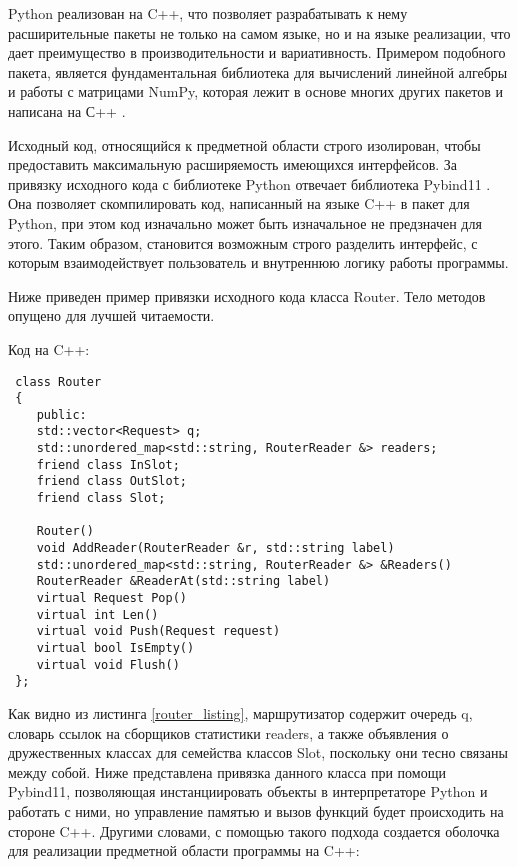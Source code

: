  Python реализован на C++, что позволяет разрабатывать к нему расширительные пакеты не только на самом языке, но и на языке реализации, что дает преимущество в производительности и вариативность. Примером подобного пакета, является фундаментальная библиотека для вычислений линейной алгебры и работы с матрицами NumPy, которая лежит в основе многих других пакетов и написана на С++ \cite{numpy}.
 
 Исходный код, относящийся к предметной области строго изолирован, чтобы предоставить максимальную расширяемость имеющихся интерфейсов. За привязку исходного кода с библиотеке Python отвечает библиотека Pybind11 \cite{pybind}. Она позволяет скомпилировать код, написанный на языке C++ в пакет для Python, при этом код изначально может быть изначальное не предзначен для этого. Таким образом, становится возможным строго разделить интерфейс, с которым взаимодействует пользователь и внутреннюю логику работы программы.
 
 Ниже приведен пример привязки исходного кода класса Router. Тело методов опущено для лучшей читаемости.
 
 Код на C++:
 \begin{lstlisting}
 class Router
 {
 	public:
 	std::vector<Request> q;
 	std::unordered_map<std::string, RouterReader &> readers;
 	friend class InSlot;
 	friend class OutSlot;
 	friend class Slot;
 	
 	Router()
 	void AddReader(RouterReader &r, std::string label)
 	std::unordered_map<std::string, RouterReader &> &Readers()
 	RouterReader &ReaderAt(std::string label)
 	virtual Request Pop()
 	virtual int Len()
 	virtual void Push(Request request)
 	virtual bool IsEmpty()	
 	virtual void Flush()
 };
 \end{lstlisting}

Как видно из листинга \ref{router_listing}, маршрутизатор содержит очередь q, словарь ссылок на сборщиков статистики readers, а также объявления о дружественных классах для семейства классов Slot, поскольку они тесно связаны между собой. Ниже представлена привязка данного класса при помощи Pybind11, позволяющая инстанциировать объекты в интерпретаторе Python и работать с ними, но управление памятью и вызов функций будет происходить на стороне C++. Другими словами, с помощью такого подхода создается оболочка для реализации предметной области программы на C++:

